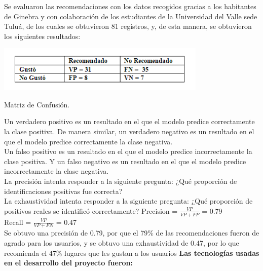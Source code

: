 \documentclass[12pt,letterpaper,openany]{book}
\begin{document}
Se evaluaron las recomendaciones con  los datos recogidos gracias a los habitantes de Ginebra y con colaboración de los estudiantes de la Universidad del Valle sede Tuluá, de los cuales se obtuvieron 81 registros, y, de esta manera, se obtuvieron los siguientes resultados:
\begin{table}[H]
\centering
\includegraphics[width=10cm]{./imagenes/PrecisionRecall}
\caption{Matriz de Confusión.}
\end{table}

Un verdadero positivo es un resultado en el que el modelo predice correctamente la clase positiva. De manera similar, un verdadero negativo es un resultado en el que el modelo predice correctamente la clase negativa.\\
Un falso positivo es un resultado en el que el modelo predice incorrectamente la clase positiva. Y un falso negativo es un resultado en el que el modelo predice incorrectamente la clase negativa.\\
La precisión intenta responder a la siguiente pregunta: ¿Qué proporción de identificaciones positivas fue correcta?\\
La exhaustividad intenta responder a la siguiente pregunta: ¿Qué proporción de positivos reales se identificó correctamente?\cite{13}\cite{26}
\vspace{5mm}\newline
Precision = $\frac{VP}{VP+FP}$ = 0.79 \\
Recall = $\frac{VP}{VP+FN}$ = 0.47\\
\newline
Se obtuvo una precisión de 0.79, por que el 79\% de las recomendaciones fueron de agrado para los usuarios, y se obtuvo una exhaustividad de 0.47, por lo que recomienda el 47\% lugares que les gustan a los usuarios
\vspace{5mm}\newline
\textbf{Las tecnologías usadas en el desarrollo del proyecto fueron:}
\end{document}
